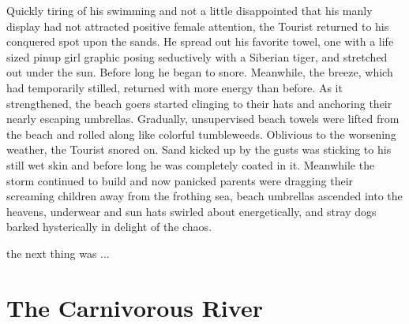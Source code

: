 \documentclass[10pt,twoside,openright]{memoir}
\begin{document}
Quickly tiring of his swimming and not a little disappointed that his manly display had not attracted positive female attention, the Tourist returned to his conquered spot upon the sands. He spread out his favorite towel, one with a life sized pinup girl graphic posing seductively with a Siberian tiger, and stretched out under the sun. Before long he began to snore. Meanwhile, the breeze, which had temporarily stilled, returned with more energy than before. As it strengthened, the beach goers started clinging to their hats and anchoring their nearly escaping umbrellas. Gradually, unsupervised beach towels were lifted from the beach and rolled along like colorful tumbleweeds. Oblivious to the worsening weather, the Tourist snored on. Sand kicked up by the gusts was sticking to his still wet skin and before long he was completely coated in it. Meanwhile the storm continued to build and now panicked parents were dragging their screaming children away from the frothing sea, beach umbrellas ascended into the heavens, underwear and sun hats swirled about energetically, and stray dogs barked hysterically in delight of the chaos.

the next thing was ...



\chapter{The Carnivorous River}

\end{document}
